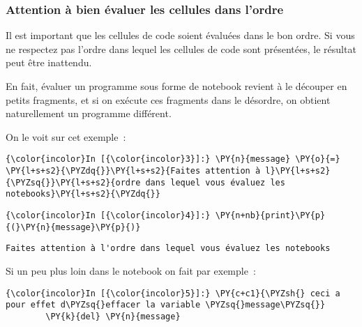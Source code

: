     \hypertarget{attention-uxe0-bien-uxe9valuer-les-cellules-dans-lordre}{%
\subsubsection{Attention à bien évaluer les cellules dans
l'ordre}\label{attention-uxe0-bien-uxe9valuer-les-cellules-dans-lordre}}

    Il est important que les cellules de code soient évaluées dans le bon
ordre. Si vous ne respectez pas l'ordre dans lequel les cellules de code
sont présentées, le résultat peut être inattendu.

En fait, évaluer un programme sous forme de notebook revient à le
découper en petits fragments, et si on exécute ces fragments dans le
désordre, on obtient naturellement un programme différent.

    On le voit sur cet exemple~:

    \begin{Verbatim}[commandchars=\\\{\},frame=single,framerule=0.3mm,rulecolor=\color{cellframecolor}]
{\color{incolor}In [{\color{incolor}3}]:} \PY{n}{message} \PY{o}{=} \PY{l+s+s2}{\PYZdq{}}\PY{l+s+s2}{Faites attention à l}\PY{l+s+s2}{\PYZsq{}}\PY{l+s+s2}{ordre dans lequel vous évaluez les notebooks}\PY{l+s+s2}{\PYZdq{}}
\end{Verbatim}


    \begin{Verbatim}[commandchars=\\\{\},frame=single,framerule=0.3mm,rulecolor=\color{cellframecolor}]
{\color{incolor}In [{\color{incolor}4}]:} \PY{n+nb}{print}\PY{p}{(}\PY{n}{message}\PY{p}{)}
\end{Verbatim}


    \begin{Verbatim}[commandchars=\\\{\},frame=single,framerule=0.3mm,rulecolor=\color{cellframecolor}]
Faites attention à l'ordre dans lequel vous évaluez les notebooks
\end{Verbatim}

    Si un peu plus loin dans le notebook on fait par exemple~:

    \begin{Verbatim}[commandchars=\\\{\},frame=single,framerule=0.3mm,rulecolor=\color{cellframecolor}]
{\color{incolor}In [{\color{incolor}5}]:} \PY{c+c1}{\PYZsh{} ceci a pour effet d\PYZsq{}effacer la variable \PYZsq{}message\PYZsq{}}
        \PY{k}{del} \PY{n}{message}
\end{Verbatim}


